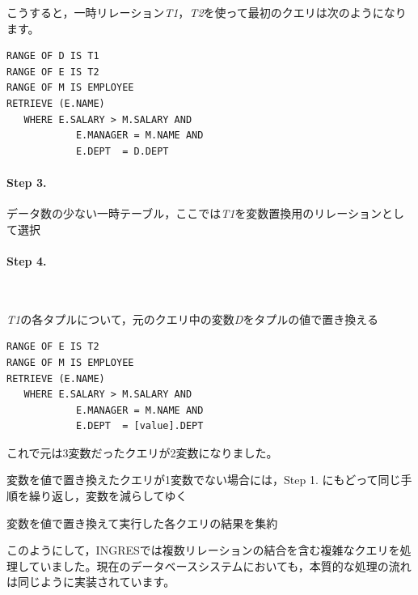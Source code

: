 こうすると，一時リレーション{\it T1}，{\it T2}を使って最初のクエリは次のようになります。

\begin{center}
 \begin{minipage}{0.8\textwidth}
  \begin{lstlisting}
RANGE OF D IS T1
RANGE OF E IS T2
RANGE OF M IS EMPLOYEE
RETRIEVE (E.NAME)
   WHERE E.SALARY > M.SALARY AND
            E.MANAGER = M.NAME AND
            E.DEPT  = D.DEPT
  \end{lstlisting}
 \end{minipage}
\end{center}

\paragraph{Step 3.}
データ数の少ない一時テーブル，ここでは{\it T1}を変数置換用のリレーションとして選択

\paragraph{Step 4.} \ 


{\it T1}の各タプルについて，元のクエリ中の変数{\it D}をタプルの値で置き換える

\begin{center}
 \begin{minipage}{0.8\textwidth}
  \begin{lstlisting}
RANGE OF E IS T2
RANGE OF M IS EMPLOYEE
RETRIEVE (E.NAME)
   WHERE E.SALARY > M.SALARY AND
            E.MANAGER = M.NAME AND
            E.DEPT  = [value].DEPT
  \end{lstlisting}
 \end{minipage}
\end{center}

これで元は3変数だったクエリが2変数になりました。


変数を値で置き換えたクエリが1変数でない場合には，Step 1. にもどって同じ手順を繰り返し，変数を減らしてゆく


変数を値で置き換えて実行した各クエリの結果を集約

このようにして，INGRESでは複数リレーションの結合を含む複雑なクエリを処理していました。現在のデータベースシステムにおいても，本質的な処理の流れは同じように実装されています。

